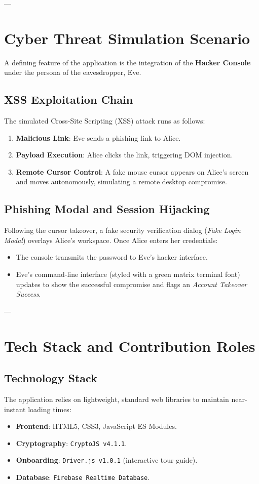 \documentclass[12pt,a4paper]{article}
\begin{document}
---

\section{Cyber Threat Simulation Scenario}
A defining feature of the application is the integration of the \textbf{Hacker Console} under the persona of the eavesdropper, Eve.

\subsection{XSS Exploitation Chain}
The simulated Cross-Site Scripting (XSS) attack runs as follows:
\begin{enumerate}
    \item \textbf{Malicious Link}: Eve sends a phishing link to Alice.
    \item \textbf{Payload Execution}: Alice clicks the link, triggering DOM injection.
    \item \textbf{Remote Cursor Control}: A fake mouse cursor appears on Alice's screen and moves autonomously, simulating a remote desktop compromise.
\end{enumerate}

\subsection{Phishing Modal and Session Hijacking}
Following the cursor takeover, a fake security verification dialog (\textit{Fake Login Modal}) overlays Alice's workspace. Once Alice enters her credentials:
\begin{itemize}
    \item The console transmits the password to Eve's hacker interface.
    \item Eve's command-line interface (styled with a green matrix terminal font) updates to show the successful compromise and flags an \textit{Account Takeover Success}.
\end{itemize}

---

\section{Tech Stack and Contribution Roles}
\subsection{Technology Stack}
The application relies on lightweight, standard web libraries to maintain near-instant loading times:
\begin{itemize}
    \item \textbf{Frontend}: HTML5, CSS3, JavaScript ES Modules.
    \item \textbf{Cryptography}: \texttt{CryptoJS v4.1.1}.
    \item \textbf{Onboarding}: \texttt{Driver.js v1.0.1} (interactive tour guide).
    \item \textbf{Database}: \texttt{Firebase Realtime Database}.
\end{itemize}
\end{document}
